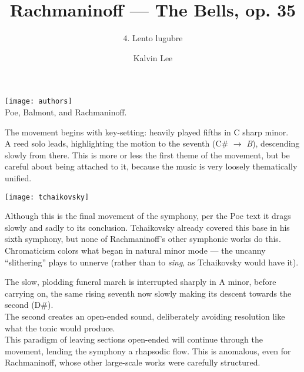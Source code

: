 \documentclass{beamer}
\title{Rachmaninoff --- The Bells, op. 35}
\subtitle{4. Lento lugubre}
\author{Kalvin Lee}
\date{}
\begin{document}
 

\begin{frame} 
  \titlepage
\end{frame} 

\begin{frame} 
  \begin{center} 
    \texttt{[image: authors]} \\ 
    {\small Poe, Balmont, and Rachmaninoff. } 
  \end{center} 
\end{frame} 

\begin{frame}
  The movement begins with key-setting: heavily played fifths in C sharp minor. 
  \pause \\ 
  A reed solo leads, highlighting the motion to the seventh (C\# \(\to\) \emph{B}), descending slowly from there. This is more or less the first theme of the movement, but be careful about being attached to it, because the music is very loosely thematically unified. 
\end{frame}

\begin{frame} 
  \begin{center} 
    \texttt{[image: tchaikovsky]}
  \end{center} 
  Although this is the final movement of the symphony, per the Poe text it drags slowly and sadly to its conclusion. Tchaikovsky already covered this base in his sixth symphony, but none of Rachmaninoff's other symphonic works do this. 
  \pause \\
  Chromaticism colors what began in natural minor mode --- the uncanny ``slithering'' plays to unnerve (rather than to \emph{sing}, as Tchaikovsky would have it). 
\end{frame} 

\begin{frame} 
  The slow, plodding funeral march is interrupted sharply in A minor, \pause before carrying on, \pause the same rising seventh now slowly making its descent towards the second (D\#). 
  \pause \\
  The second creates an open-ended sound, deliberately avoiding resolution like what the tonic would produce. 
  \pause \\ 
  This paradigm of leaving sections open-ended will continue through the movement, lending the symphony a rhapsodic flow. This is anomalous, even for Rachmaninoff, whose other large-scale works were carefully structured. 
\end{frame}
\end{document}
